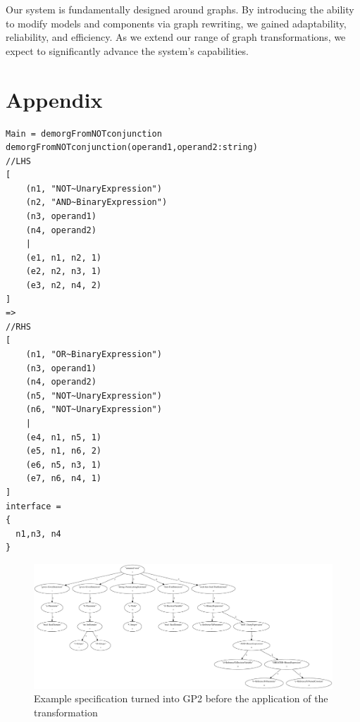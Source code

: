 Our system is fundamentally designed around graphs. By introducing the ability to modify models and components via graph rewriting, we gained adaptability, reliability, and efficiency. As we extend our range of graph transformations, we expect to significantly advance the system's capabilities.

\newpage




\appendix

\section{Appendix}

\begin{lstlisting}[caption={A De Morgan rule implemented in GP2},label={lst:demorgGP2}]
Main = demorgFromNOTconjunction
demorgFromNOTconjunction(operand1,operand2:string)
//LHS
[
    (n1, "NOT~UnaryExpression")
    (n2, "AND~BinaryExpression")
    (n3, operand1)
    (n4, operand2)
    |
    (e1, n1, n2, 1)
    (e2, n2, n3, 1)
    (e3, n2, n4, 2)
]
=>
//RHS
[
    (n1, "OR~BinaryExpression")
    (n3, operand1)
    (n4, operand2)
    (n5, "NOT~UnaryExpression")
    (n6, "NOT~UnaryExpression")
    |
    (e4, n1, n5, 1)
    (e5, n1, n6, 2)
    (e6, n5, n3, 1)
    (e7, n6, n4, 1)
]
interface =
{
  n1,n3, n4
}

\end{lstlisting}

\begin{figure}[htb]
\begin{center}
\includegraphics[angle=90,height=0.9\textheight,width=\textwidth]{demorg-BEFORE.pdf}
\caption{Example specification turned into GP2 before the application of the transformation}
\end{center}
\label{fig:demorgBEFORE}
\end{figure}

